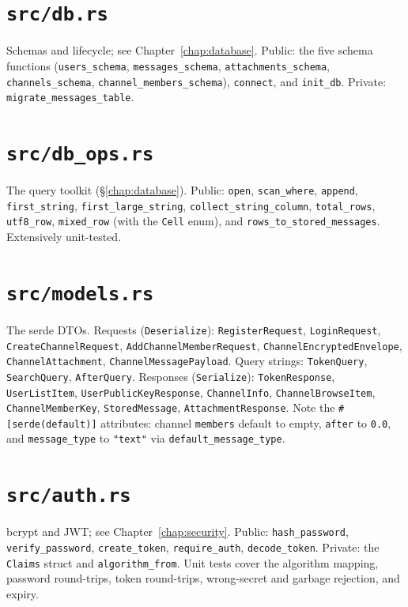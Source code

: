 \section{\texttt{src/db.rs}}
Schemas and lifecycle; see Chapter~\ref{chap:database}. Public: the five schema
functions (\verb|users_schema|, \verb|messages_schema|, \verb|attachments_schema|,
\verb|channels_schema|, \verb|channel_members_schema|), \verb|connect|, and
\verb|init_db|. Private: \verb|migrate_messages_table|.

\section{\texttt{src/db\_ops.rs}}
The query toolkit (\S\ref{chap:database}). Public: \verb|open|, \verb|scan_where|,
\verb|append|, \verb|first_string|, \verb|first_large_string|,
\verb|collect_string_column|, \verb|total_rows|, \verb|utf8_row|, \verb|mixed_row|
(with the \verb|Cell| enum), and \verb|rows_to_stored_messages|. Extensively
unit-tested.

\section{\texttt{src/models.rs}}
The serde DTOs. Requests (\verb|Deserialize|): \verb|RegisterRequest|,
\verb|LoginRequest|, \verb|CreateChannelRequest|, \verb|AddChannelMemberRequest|,
\verb|ChannelEncryptedEnvelope|, \verb|ChannelAttachment|,
\verb|ChannelMessagePayload|. Query strings: \verb|TokenQuery|, \verb|SearchQuery|,
\verb|AfterQuery|. Responses (\verb|Serialize|): \verb|TokenResponse|,
\verb|UserListItem|, \verb|UserPublicKeyResponse|, \verb|ChannelInfo|,
\verb|ChannelBrowseItem|, \verb|ChannelMemberKey|, \verb|StoredMessage|,
\verb|AttachmentResponse|. Note the \verb|#[serde(default)]| attributes: channel
\verb|members| default to empty, \verb|after| to \verb|0.0|, and
\verb|message_type| to \verb|"text"| via \verb|default_message_type|.

\section{\texttt{src/auth.rs}}
bcrypt and JWT; see Chapter~\ref{chap:security}. Public: \verb|hash_password|,
\verb|verify_password|, \verb|create_token|, \verb|require_auth|,
\verb|decode_token|. Private: the \verb|Claims| struct and \verb|algorithm_from|.
Unit tests cover the algorithm mapping, password round-trips, token round-trips,
wrong-secret and garbage rejection, and expiry.

